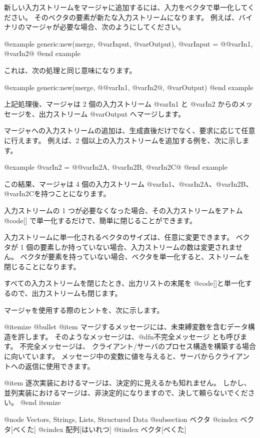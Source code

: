 {{新しい入力ストリームをマージャに追加するには、入力をベクタで単一化してください。
そのベクタの要素が新たな入力ストリームになります。
例えば、バイナリのマージャが必要な場合、次のようにしてください。

@example
generic:new(merge, @var{Input}, @var{Output}),
@var{Input} = @{@var{In1}, @var{In2}@}
@end example

これは、次の処理と同じ意味になります。

@example
generic:new(merge, @{@var{In1}, @var{In2}@}, @var{Output})
@end example

上記処理後、マージャは 2 個の入力ストリーム @var{In1} と @var{In2} からのメッセージを、出力ストリーム @var{Output} へマージします。

マージャへの入力ストリームの追加は、生成直後だけでなく、要求に応じて任意に行えます。
例えば、2 個以上の入力ストリームを追加する例を、次に示します。

@example
@var{In2} = @{@var{In2A}, @var{In2B}, @var{In2C}@}
@end example

この結果、マージャは 4 個の入力ストリーム @var{In1}、@var{In2A}、@var{In2B}、@var{In2C}を持つことになります。

入力ストリームの 1 つが必要なくなった場合、その入力ストリームをアトム @code{[]} で単一化するだけで、簡単に閉じることができます。

入力ストリームに単一化されるベクタのサイズは、任意に変更できます。
ベクタが 1 個の要素しか持っていない場合、入力ストリームの数は変更されません。
ベクタが要素を持っていない場合、ベクタを単一化すると、ストリームを閉じることになります。

すべての入力ストリームを閉じたとき、出力リストの末尾を @code{[]}と単一化するので、出力ストリームも閉じます。

マージャを使用する際のヒントを、次に示します。

@itemize @bullet
@item
マージするメッセージには、未束縛変数を含むデータ構造を許します。
そのようなメッセージは、@dfn{不完全メッセージ} とも呼びます。
不完全メッセージは、
クライアント/サーバのプロセス構造を構築する場合に向いています。
メッセージ中の変数に値を与えると、サーバからクライアントへの返信に使用できます。

@item 
逐次実装におけるマージは、決定的に見えるかも知れません。
しかし、並列実装におけるマージは、非決定的になりますので、決して頼らないでください。
@end itemize

@node Vectors, Strings, Lists, Structured Data
@subsection ベクタ
@cindex ベクタ[べくた]
@cindex 配列[はいれつ]
@tindex ベクタ[べくた]

}}
